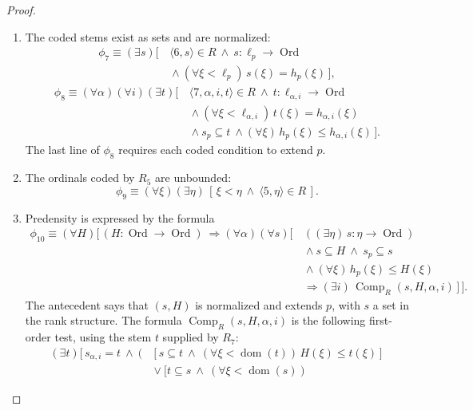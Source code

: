 \documentclass[11pt,a4paper]{amsart}
\theoremstyle{definition}
\theoremstyle{remark}
\DeclareMathOperator{\dom}{dom}
\DeclareMathOperator{\Ord}{Ord}
\DeclareMathOperator{\Comp}{Comp}
\begin{document}
\begin{proof}
\begin{enumerate}[label=\textup{(\alph*)}]
\(\ell_p,h_p(\xi),\ell_{\alpha,i},\delta_{\alpha,i}\),
and \(h_{\alpha,i}(\xi)\), respectively.
\item The coded stems exist as sets and are normalized:
\[
\begin{split}
 \phi_7\equiv (\exists s)\bigl[\,&\langle6,s\rangle\in R
       \ \land\ s:\ell_p\to\Ord\\
       &{}\land(\forall\xi<\ell_p)\,s(\xi)=h_p(\xi)\,\bigr],
\end{split}
\]
\[
\begin{split}
 \phi_8\equiv (\forall\alpha)(\forall i)(\exists t)\bigl[\,
       &\langle7,\alpha,i,t\rangle\in R
          \ \land\ t:\ell_{\alpha,i}\to\Ord\\
       &{}\land(\forall\xi<\ell_{\alpha,i})\,
                                 t(\xi)=h_{\alpha,i}(\xi)\\
       &{}\land s_p\subseteq t
          \ \land(\forall\xi)\,h_p(\xi)\leq h_{\alpha,i}(\xi)
       \,\bigr].
\end{split}
\]
The last line of \(\phi_8\) requires each coded condition
to extend \(p\).
\item The ordinals coded by \(R_5\) are unbounded:
\[
 \phi_9\equiv (\forall\xi)(\exists\eta)\,
       [\,\xi<\eta\ \land\ \langle5,\eta\rangle\in R\,].
\]
\item Predensity is expressed by the formula
\begin{equation*}\label{eq:predense}
\begin{split}
 \phi_{10}\equiv (\forall H)\bigl[\,(H:\Ord\to\Ord)\ \Longrightarrow
 (\forall\alpha)(\forall s)\bigl[\,
       &((\exists\eta)\,s:\eta\to\Ord)\\
       &{}\land s\subseteq H\ \land\ s_p\subseteq s\\
       &{}\land(\forall\xi)\,h_p(\xi)\leq H(\xi)\\
       &\Longrightarrow
               (\exists i)\,\Comp_R(s,H,\alpha,i)
       \,\bigr]\,\bigr].
\end{split}
\end{equation*}
The antecedent says that \((s,H)\) is normalized and extends
\(p\), with \(s\) a set in the rank structure.
The formula \(\Comp_R(s,H,\alpha,i)\) is the following
first-order test, using the stem \(t\) supplied by \(R_7\):
\[
\begin{split}
 (\exists t)\bigl[\,s_{\alpha,i}=t\ \land\
 \bigl(&[s\subseteq t\ \land\
             (\forall\xi<\dom(t))\,H(\xi)\leq t(\xi)]\\
 &{}\lor[t\subseteq s\ \land\
             (\forall\xi<\dom(s))\,

\end{split}\]
\end{enumerate}
\end{proof}
\end{document}
